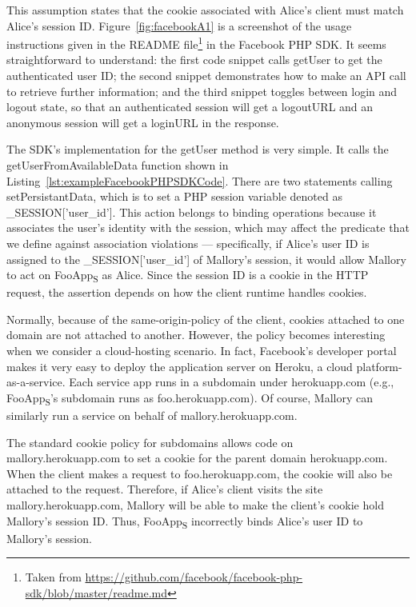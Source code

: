   This assumption states that the cookie associated with Alice's client must match Alice's session ID. Figure~\ref{fig:facebookA1} is a screenshot of the usage instructions given in the README file\footnote{Taken from \url{https://github.com/facebook/facebook-php-sdk/blob/master/readme.md}} in the Facebook PHP SDK.  It seems straightforward to understand: the first code snippet calls getUser to get the authenticated user ID; the second snippet demonstrates how to make an API call to retrieve further information; and the third snippet toggles between login and logout state, so that an authenticated session will get a logoutURL and an anonymous session will get a loginURL in the response.

The SDK's implementation for the getUser method is very simple. It calls the getUserFromAvailableData function shown in Listing~\ref{lst:exampleFacebookPHPSDKCode}.  There are two statements calling setPersistantData, which is to set a PHP session variable denoted as \_SESSION['user\_id'].  This action belongs to binding operations because it associates the user's identity with the session, which may affect the predicate that we define against association violations --- specifically, if Alice's user ID is assigned to the \_SESSION['user\_id'] of Mallory's session, it would allow Mallory to act on FooApp\textsubscript{S} as Alice.  Since the session ID is a cookie in the HTTP request, the assertion depends on how the client runtime handles cookies.  

Normally, because of the same-origin-policy of the client, cookies attached to one domain are not attached to another. However, the policy becomes interesting when we consider a cloud-hosting scenario.  In fact, Facebook's developer portal makes it very easy to deploy the application server on Heroku, a cloud platform-as-a-service.  Each service app runs in a subdomain under herokuapp.com (e.g., FooApp\textsubscript{S}'s subdomain runs as foo.herokuapp.com).  Of course, Mallory can similarly run a service on behalf of mallory.herokuapp.com.

The standard cookie policy for subdomains allows code on mallory.herokuapp.com to set a cookie for the parent domain herokuapp.com.  When the client makes a request to foo.herokuapp.com, the cookie will also be attached to the request. Therefore, if Alice's client visits the site mallory.herokuapp.com, Mallory will be able to make the client's cookie hold Mallory's session ID.  Thus, FooApp\textsubscript{S} incorrectly binds Alice's user ID to Mallory's session. 

